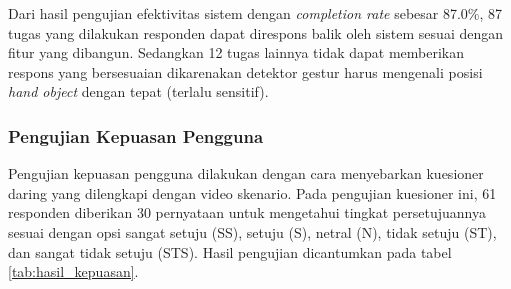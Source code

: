 \documentclass[conference]{IEEEtran}
\begin{document}
			Dari hasil pengujian efektivitas sistem dengan \textit{completion rate} sebesar 87.0\%, 87 tugas yang dilakukan responden dapat direspons balik oleh sistem sesuai dengan fitur yang dibangun. Sedangkan 12 tugas lainnya tidak dapat memberikan respons yang bersesuaian dikarenakan detektor gestur harus mengenali posisi \textit{hand object} dengan tepat (terlalu sensitif). 

		\subsubsection{Pengujian Kepuasan Pengguna} 		
			Pengujian kepuasan pengguna dilakukan dengan cara menyebarkan kuesioner daring yang dilengkapi dengan video skenario. Pada pengujian kuesioner ini, 61 responden diberikan 30 pernyataan untuk mengetahui tingkat persetujuannya sesuai dengan opsi sangat setuju (SS), setuju (S), netral (N), tidak setuju (ST), dan sangat tidak setuju (STS). Hasil pengujian dicantumkan pada tabel \ref{tab:hasil_kepuasan}.
			
\end{document}
